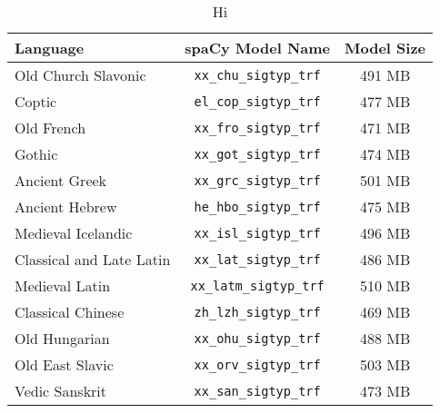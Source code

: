 \documentclass{../acl_latex.tex}
\begin{document}
\begin{table*}[t]
    \centering
    \begin{tabular}{lcc}
        \toprule
        Language                 & spaCy Model Name               & Model Size \\ \midrule
        Old Church Slavonic      & \texttt{xx\_chu\_sigtyp\_trf}  & 491 MB     \\
        Coptic                   & \texttt{el\_cop\_sigtyp\_trf}  & 477 MB     \\
        Old French               & \texttt{xx\_fro\_sigtyp\_trf}  & 471 MB     \\
        Gothic                   & \texttt{xx\_got\_sigtyp\_trf}  & 474 MB     \\
        Ancient Greek            & \texttt{xx\_grc\_sigtyp\_trf}  & 501 MB     \\
        Ancient Hebrew           & \texttt{he\_hbo\_sigtyp\_trf}  & 475 MB     \\
        Medieval Icelandic       & \texttt{xx\_isl\_sigtyp\_trf}  & 496 MB     \\
        Classical and Late Latin & \texttt{xx\_lat\_sigtyp\_trf}  & 486 MB     \\
        Medieval Latin           & \texttt{xx\_latm\_sigtyp\_trf} & 510 MB     \\
        Classical Chinese        & \texttt{zh\_lzh\_sigtyp\_trf}  & 469 MB     \\
        Old Hungarian            & \texttt{xx\_ohu\_sigtyp\_trf}  & 488 MB     \\
        Old East Slavic          & \texttt{xx\_orv\_sigtyp\_trf}  & 503 MB     \\
        Vedic Sanskrit           & \texttt{xx\_san\_sigtyp\_trf}  & 473 MB     \\ \bottomrule
    \end{tabular}
    \caption{
        Hi
    }
    \label{table:model_table}
\end{table*}
\end{document}
